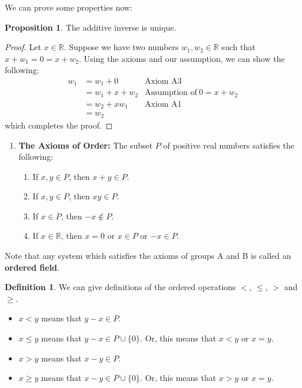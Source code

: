 \documentclass[12pt]{article}
\newcommand{\R}{\mathbb{R}}
\theoremstyle{definition}
\newtheorem*{definition}{Definition}
\newtheorem{prop}{Proposition}
\begin{document}
    We can prove some properties now:

    \noindent 
    \begin{prop}
        The additive inverse is unique. 
            \begin{proof}
                Let \( x \in \R \). Suppose we have two numbers \( w_1, w_2 \in \R \) such that \( x + w_1 = 0 = x + w_2 \). Using the axioms and our assumption, we can show the following:
                    \begin{align*}
                        w_1 &= w_1 + 0 & \text{Axiom A3} \\
                            &= w_1 + x + w_2 & \text{Assumption of} \ 0 = x + w_2 \\
                            &= w_2 + x w_1 & \text{Axiom A1} \\
                            &= w_2
                    \end{align*}
                which completes the proof.
            \end{proof}
    \end{prop}

\begin{enumerate}[label=\textbf{B}.]
    \item \textbf{The Axioms of Order:} The subset \( P \) of positive real numbers satisfies the following:
    \begin{enumerate}[label=B\arabic*.]
        \item If \( x, y \in P\), then \( x + y \in P \).
        \item If \( x, y \in P\), then \( xy \in P \).
        \item If \( x \in P \), then \( -x \not\in P \).
        \item If \( x \in \R \), then \( x = 0 \) or \( x \in P \) or \( -x \in P \).
    \end{enumerate}
\end{enumerate}

Note that any system which satisfies the axioms of groups A and B is called an  \textbf{ordered field}.

\begin{definition} We can give definitions of the ordered operations \( < \), \( \leq \), \( > \) and \( \geq \).
    \begin{itemize}
        \item \( x < y \) means that \( y - x \in P \).
        \item \( x \leq y \) means that \( y - x \in P \cup \{ 0 \} \). Or, this means that \( x < y \) or \( x = y \).
        \item \( x > y \) means that \( x - y \in P \).
        \item \( x \geq y \) means that \( x - y \in P \cup \{ 0 \} \). Or, this means that \( x > y \) or \( x = y \).
    \end{itemize}
\end{definition}
\end{document}
